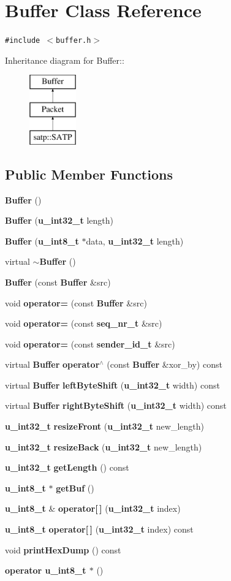\section{Buffer Class Reference}
\label{classBuffer}
{\tt \#include $<$buffer.h$>$}

Inheritance diagram for Buffer::\begin{figure}[H]
\begin{center}
\leavevmode
\includegraphics[height=3cm]{classBuffer}
\end{center}
\end{figure}
\subsection*{Public Member Functions}
\begin{CompactItemize}
\item 
{\bf Buffer} ()
\item 
{\bf Buffer} ({\bf u\_\-int32\_\-t} length)
\item 
{\bf Buffer} ({\bf u\_\-int8\_\-t} $\ast$data, {\bf u\_\-int32\_\-t} length)
\item 
virtual {\bf $\sim$Buffer} ()
\item 
{\bf Buffer} (const {\bf Buffer} \&src)
\item 
void {\bf operator=} (const {\bf Buffer} \&src)
\item 
void {\bf operator=} (const {\bf seq\_\-nr\_\-t} \&src)
\item 
void {\bf operator=} (const {\bf sender\_\-id\_\-t} \&src)
\item 
virtual {\bf Buffer} {\bf operator$^\wedge$} (const {\bf Buffer} \&xor\_\-by) const 
\item 
virtual {\bf Buffer} {\bf left\-Byte\-Shift} ({\bf u\_\-int32\_\-t} width) const
\item 
virtual {\bf Buffer} {\bf right\-Byte\-Shift} ({\bf u\_\-int32\_\-t} width) const
\item 
{\bf u\_\-int32\_\-t} {\bf resize\-Front} ({\bf u\_\-int32\_\-t} new\_\-length)
\item 
{\bf u\_\-int32\_\-t} {\bf resize\-Back} ({\bf u\_\-int32\_\-t} new\_\-length)
\item 
{\bf u\_\-int32\_\-t} {\bf get\-Length} () const
\item 
{\bf u\_\-int8\_\-t} $\ast$ {\bf get\-Buf} ()
\item 
{\bf u\_\-int8\_\-t} \& {\bf operator[$\,$]} ({\bf u\_\-int32\_\-t} index)
\item 
{\bf u\_\-int8\_\-t} {\bf operator[$\,$]} ({\bf u\_\-int32\_\-t} index) const
\item 
void {\bf print\-Hex\-Dump} () const
\item 
{\bf operator u\_\-int8\_\-t $\ast$} ()
\end{CompactItemize}
